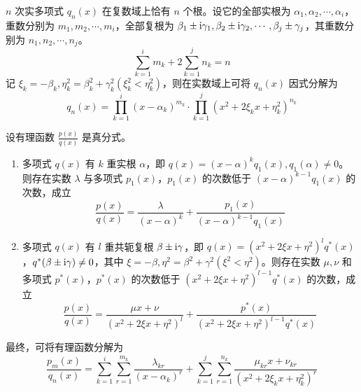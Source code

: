 \documentclass{ctexbook}
\begin{document}
\begin{theorem}[代数学基本定理]
    $n$ 次实多项式 $q_n(x)$ 在复数域上恰有 $n$ 个根。设它的全部实根为 $\alpha_1,\alpha_2,\cdots,\alpha_i$，重数分别为 $m_1,m_2,\cdots,m_i$，全部复根为 $\beta_1\pm\textnormal{i}\gamma_1,\beta_2\pm\textnormal{i}\gamma_2,\cdots,\beta_j\pm\gamma_j$，其重数分别为 $n_1,n_2,\cdots,n_j$。
    \begin{equation}
        \sum_{k=1}^i m_k+2\sum_{k=1}^j n_k=n
    \end{equation}
    记 $\xi_k=-\beta_k, \eta_k^2=\beta_k^2+\gamma_k^2 (\xi_k^2<\eta_k^2)$，则在实数域上可将 $q_n(x)$ 因式分解为
    \begin{equation}
        q_n(x)=\prod_{k=1}^i(x-\alpha_k)^{m_k}\cdot\prod_{k=1}^j(x^2+2\xi_kx+\eta_k^2)^{n_k}
    \end{equation}
\end{theorem}

\begin{theorem}[有理函数真分式分解]
    设有理函数 $\frac{p(x)}{q(x)}$ 是真分式。
    \begin{enumerate}
        \item 多项式 $q(x)$ 有 $k$ 重实根 $\alpha$，即 $q(x)=(x-\alpha)^kq_1(x), q_1(\alpha)\neq 0$。则存在实数 $\lambda$ 与多项式 $p_1(x)$，$p_1(x)$ 的次数低于 $(x-\alpha)^{k-1}q_1(x)$ 的次数，成立
        \begin{equation}
            \frac{p(x)}{q(x)}=\frac{\lambda}{(x-\alpha)^k}+\frac{p_1(x)}{(x-\alpha)^{k-1}q_1(x)}
        \end{equation}
        \item 多项式 $q(x)$ 有 $l$ 重共轭复根 $\beta\pm\textnormal{i}\gamma$，即 $q(x)=(x^2+2\xi x+\eta^2)^lq^*(x)$，$q^*(\beta\pm\textnormal{i}\gamma)\neq 0$，其中 $\xi=-\beta,\eta^2=\beta^2+\gamma^2(\xi^2<\eta^2)$。则存在实数 $\mu,\nu$ 和多项式 $p^*(x)$，$p^*(x)$ 的次数低于 $(x^2+2\xi x+\eta^2)^{l-1}q^*(x)$ 的次数，成立
        \begin{equation}
            \frac{p(x)}{q(x)}=\frac{\mu x+\nu}{(x^2+2\xi x+\eta^2)^l}+\frac{p^*(x)}{(x^2+2\xi x+\eta^2)^{l-1}q^*(x)}
        \end{equation}
    \end{enumerate}
    最终，可将有理函数分解为
    \begin{equation}
        \frac{p_m(x)}{q_n(x)}=\sum_{k=1}^i\sum_{r=1}^{m_k}\frac{\lambda_{kr}}{(x-\alpha_k)^r}+\sum_{k=1}^j\sum_{r=1}^{n_k}\frac{\mu_{kr}x+\nu_{kr}}{(x^2+2\xi_kx+\eta^2_k)^r}
    \end{equation}
\end{theorem}
\end{document}
